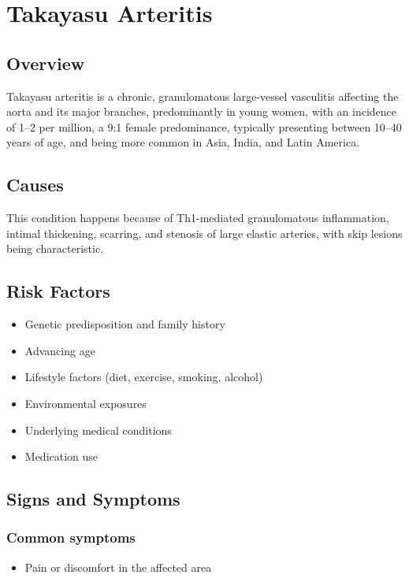 \chapter{Takayasu Arteritis}
\label{sec:Takayasu Arteritis}

\section{Overview}
Takayasu arteritis is a chronic, granulomatous large-vessel vasculitis affecting the aorta and its major branches, predominantly in young women, with an incidence of 1--2 per million, a 9:1 female predominance, typically presenting between 10--40 years of age, and being more common in Asia, India, and Latin America.
\section{Causes}
This condition happens because of Th1-mediated granulomatous inflammation, intimal thickening, scarring, and stenosis of large elastic arteries, with skip lesions being characteristic.     
\section{Risk Factors}

\begin{itemize}[noitemsep]
  \item Genetic predisposition and family history
  \item Advancing age
  \item Lifestyle factors (diet, exercise, smoking, alcohol)
  \item Environmental exposures
  \item Underlying medical conditions
  \item Medication use
\end{itemize}
\section{Signs and Symptoms}

\subsection{Common symptoms}
\begin{itemize}[noitemsep]
  \item Pain or discomfort in the affected area
  \end{itemize}


